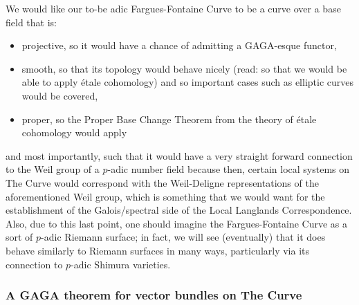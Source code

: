                 We would like our to-be adic Fargues-Fontaine Curve to be a curve over a base field that is:
                    \begin{itemize}
                        \item projective, so it would have a chance of admitting a GAGA-esque functor,
                        \item smooth, so that its topology would behave nicely (read: so that we would be able to apply \'etale cohomology) and so important cases such as elliptic curves would be covered, 
                        \item proper, so the Proper Base Change Theorem from the theory of \'etale cohomology would apply 
                    \end{itemize}
                and most importantly, such that it would have a very straight forward connection to the Weil group of a $p$-adic number field because then, certain local systems on The Curve would correspond with the Weil-Deligne representations of the aforementioned Weil group, which is something that we would want for the establishment of the Galois/spectral side of the Local Langlands Correspondence. Also, due to this last point, one should imagine the Fargues-Fontaine Curve as a sort of $p$-adic Riemann surface; in fact, we will see (eventually) that it does behave similarly to Riemann surfaces in many ways, particularly via its connection to $p$-adic Shimura varieties.
            
            \subsubsection{A GAGA theorem for vector bundles on The Curve}